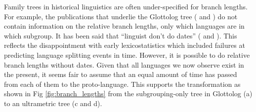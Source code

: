 \documentclass[draft,10pt]{article} %
\begin{document}
%
%
%    
Family trees in historical linguistics are often under-specified for branch lengths. For example, the publications that underlie the Glottolog tree (\citet{blust_2009, blust_2014} and \citet{blust_chen_2017}) do not contain information on the relative branch lengths, only which languages are in which subgroup. It has been said that ``linguist don't do dates'' (\citet{mcmahon2006linguists} and \citet{gray2011language}). This reflects the disappointment with early lexicostatistics which included failures at predicting language splitting events in time. However, it is possible to do relative branch lengths without dates. Given that all languages we now observe exist in the present, it seems fair to assume that an equal amount of time has passed from each of them to the proto-language. This supports the transformation as shown in Fig \ref{fig:branch_lengths} from the subgrouping-only tree in Glottolog (a) to an ultrametric tree (c and d).
\end{document}
